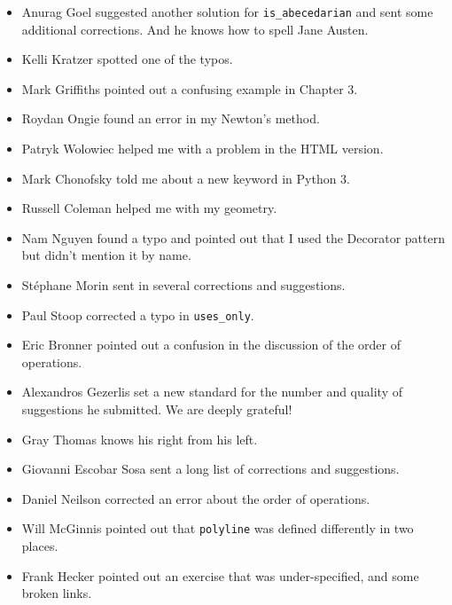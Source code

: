 \documentclass[10pt]{book}
\begin{document}
\begin{itemize}
\item Anurag Goel suggested another solution for \verb"is_abecedarian"
and sent some additional corrections.  And he knows how to
spell Jane Austen.

\item Kelli Kratzer spotted one of the typos.

\item Mark Griffiths pointed out a confusing example in Chapter 3.

\item Roydan Ongie found an error in my Newton's method.

\item Patryk Wolowiec helped me with a problem in the HTML version.

\item Mark Chonofsky told me about a new keyword in Python 3.

\item Russell Coleman helped me with my geometry.

\item Nam Nguyen found a typo and pointed out that I used the Decorator
pattern but didn't mention it by name.

\item St\'{e}phane Morin sent in several corrections and suggestions.

\item Paul Stoop corrected a typo in \verb+uses_only+.

\item Eric Bronner pointed out a confusion in the discussion of the
order of operations.

\item Alexandros Gezerlis set a new standard for the number and
quality of suggestions he submitted.  We are deeply grateful!

\item Gray Thomas knows his right from his left.

\item Giovanni Escobar Sosa sent a long list of corrections and
suggestions.

\item Daniel Neilson corrected an error about the order of operations.

\item Will McGinnis pointed out that {\tt polyline} was defined
differently in two places.

\item Frank Hecker pointed out an exercise that was under-specified, and
some broken links.


\end{itemize}
\end{document}
